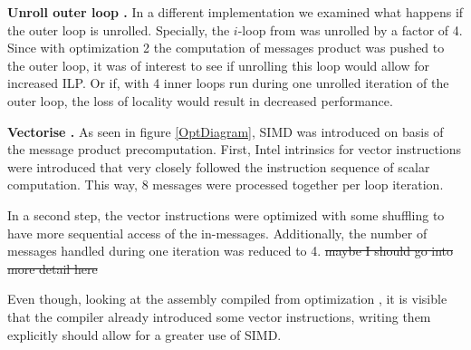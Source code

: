 \documentclass[letterpaper]{article}
\let\cref=\Cref %
\newcommand{\mypar}[1]{{\bf #1.}}
\begin{document}
\mypar{Unroll outer loop }
In a different implementation we examined what happens if the outer loop is unrolled. Specially, the $i$-loop from \cref{algo:propagate} was unrolled by a factor of 4. Since with optimization 2 the computation of messages product was pushed to the outer loop, it was of interest to see if unrolling this loop would allow for increased ILP. Or if, with 4 inner loops run during one unrolled iteration of the outer loop, the loss of locality would result in decreased performance.

\mypar{Vectorise }
As seen in figure \ref{OptDiagram}, SIMD was introduced on basis of the message product precomputation. First, Intel intrinsics for vector instructions were introduced that very closely followed the instruction sequence of scalar computation. This way, 8 messages were processed together per loop iteration.

In a second step, the vector instructions were optimized with some shuffling to have more sequential access of the in-messages. Additionally, the number of messages handled during one iteration was reduced to 4. \st{maybe I should go into more detail here}

Even though, looking at the assembly compiled from optimization , it is visible that the compiler already introduced some vector instructions, writing them explicitly should allow for a greater use of SIMD.

\end{document}
